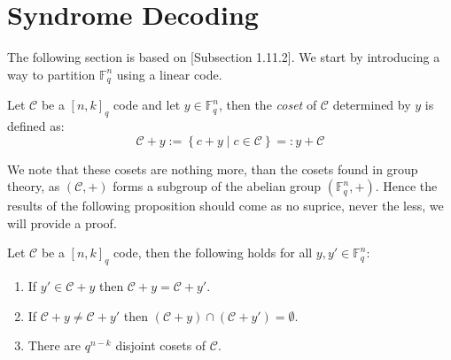 \section{Syndrome Decoding} \label{sec:syndrome_decoding}
The following section is based on \cite{huffman}[Subsection 1.11.2]. We start by introducing a way to partition $\mathbb{F}_q^n$ using a linear code.
\begin{definition}
  Let $\mathcal{C}$ be a $[n, k]_q$ code and let $y \in \mathbb{F}_q^n$, then the \textit{coset} of $\mathcal{C}$ determined by $y$ is defined as:
  \begin{equation*}
    \mathcal{C} + y := \left\{c + y \middle | c \in \mathcal{C}\right\} =: y + \mathcal{C}
  \end{equation*}
\end{definition}
We note that these cosets are nothing more, than the cosets found in group theory, as $(\mathcal{C}, +)$ forms a subgroup of the abelian group $(\mathbb{F}_q^n, +)$. Hence the results of the following proposition should come as no suprice, never the less, we will provide a proof.
\begin{proposition}\label{prop:basic_properties_of_cosets}
  Let $\mathcal{C}$ be a $[n, k]_q$ code, then the following holds for all $y, y' \in \mathbb{F}_q^{n}$:
  \begin{enumerate}
    \item If $y' \in \mathcal{C} + y$ then $\mathcal{C} + y = \mathcal{C} + y'$.\label{prop:basic_properties_of_coset1}
    \item If $\mathcal{C} + y \neq \mathcal{C} + y'$ then $(\mathcal{C} + y) \cap (\mathcal{C} + y') = \emptyset$. \label{prop:basic_properties_of_coset2}
    \item There are $q^{n - k}$ disjoint cosets of $\mathcal{C}$. \label{prop:basic_properties_of_coset3}
  \end{enumerate}
\end{proposition}
